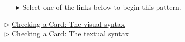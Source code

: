 \vspace{0.5cm}
\begin{itemize}
\item[$\blacktriangleright$] Select one of the links below to begin this pattern.
\end{itemize}

\begin{center} {$\triangleright$ \hyperlink{checkCard vis}{Checking a Card: The visual syntax}}%
\\ \vspace{0.5cm}
{$\triangleright$ \hyperlink{checkCard tex}{Checking a Card: The textual syntax} }\end{center} 




